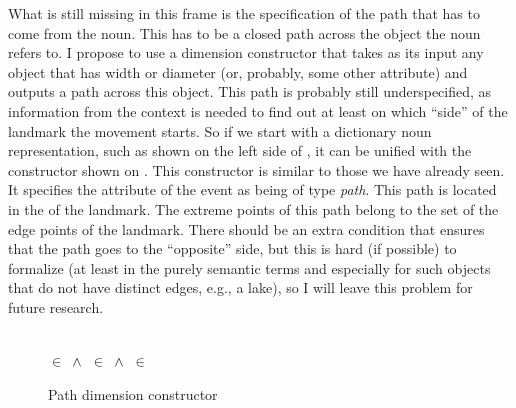 What is still missing in this frame is the specification of the path that has to come from the noun. This has to be a closed path across the object the noun refers to. I propose to use a dimension constructor that takes as its input any object that has width or diameter (or, probably, some other attribute) and outputs a path across this object. This path is probably still underspecified, as information from the context is needed to find out at least on which ``side'' of the landmark the movement starts. So if we start with a dictionary noun representation, such as shown on the left side of , it can be unified with the constructor shown on . This constructor is similar to those we have already seen. It specifies the \NOUNDIM attribute of the event as being of type \textit{path}. This path is located in the \LOC of the landmark. The extreme points of this path belong to the set of the edge points of the landmark. There should be an extra condition that ensures that the path goes to the ``opposite'' side, but this is hard (if possible) to formalize (at least in the purely semantic terms and especially for such objects that do not have distinct edges, e.g., a lake), so I will leave this problem for future research.  

\begin{figure}\small
\begin{minipage}{0.3\textwidth}
\end{minipage}\hfill%
\begin{minipage}{0.3\textwidth}\centering
{}\\
 $\in$  $\,\wedge\,$  $\in$  $\,\wedge\,$  $\in$ 
\end{minipage}\hfill%
\begin{minipage}{0.25\textwidth}
\end{minipage}
\caption{Path dimension constructor\label{constructor:path}}
\end{figure}

